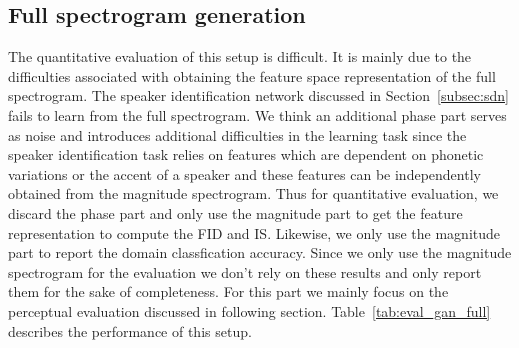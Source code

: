 \subsection{Full spectrogram generation}
\label{subsec:full_spec_gen}
The quantitative evaluation of this setup is difficult. It is mainly due to the difficulties associated with obtaining the feature space representation of the full spectrogram. The speaker identification network discussed in Section~\ref{subsec:sdn} fails to learn from the full spectrogram. We think an additional phase part serves as noise and introduces additional difficulties in the learning task since the speaker identification task relies on features which are dependent on phonetic variations or the accent of a speaker and these features can be independently obtained from the magnitude spectrogram. Thus for quantitative evaluation, we discard the phase part and only use the magnitude part to get the feature representation to compute the FID and IS. Likewise, we only use the magnitude part to report the domain classfication accuracy. Since we only use the magnitude spectrogram for the evaluation we don't rely on these results and only report them for the sake of completeness. For this part we mainly focus on the perceptual evaluation discussed in following section. Table~\ref{tab:eval_gan_full} describes the performance of this setup.  


